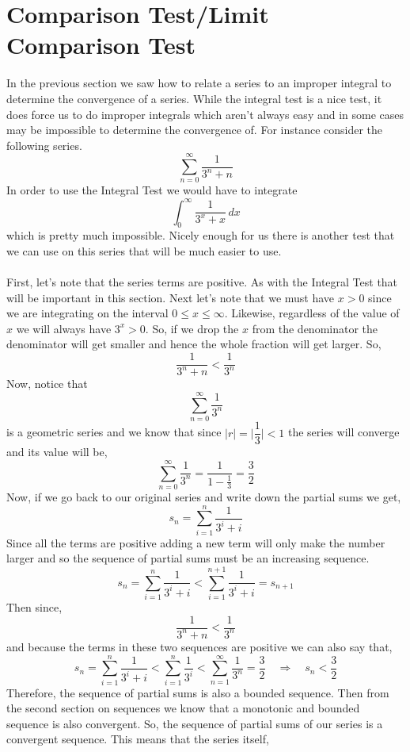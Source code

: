 \documentclass[10pt,reqno]{book}
\theoremstyle{definition}
\begin{document}
	
	\section{Comparison Test/Limit Comparison Test}
	
	In the previous section we saw how to relate a series to an improper integral to determine the convergence of a series. While the integral test is a nice test, it does force us to do improper integrals which aren't always easy and in some cases may be impossible to determine the convergence of. For instance consider the following series.
	\[ \sum\limits_{n=0}^{\infty} \frac{1}{3^n + n} \]
	In order to use the Integral Test we would have to integrate
	\[ \int_{0}^{\infty} \frac{1}{3^x + x}\,dx \]
	which is pretty much impossible. Nicely enough for us there is another test that we can use on this series that will be much easier to use.\\ \\
	First, let's note that the series terms are positive. As with the Integral Test that will be important in this section. Next let's note that we must have $ x > 0 $ since we are integrating on the interval $ 0 \leq x \leq \infty $. Likewise, regardless of the value of $ x $ we will always have $ 3^x > 0 $. So, if we drop the $ x $ from the denominator the denominator will get smaller and hence the whole fraction will get larger. So,
	\[ \frac{1}{3^n + n} < \frac{1}{3^n} \]
	Now, notice that
	\[ \sum\limits_{n=0}^{\infty} \frac{1}{3^n} \]
	is a geometric series and we know that since $ |r| = \bigg|\dfrac{1}{3}\bigg| < 1 $ the series will converge and its value will be,
	\[ \sum\limits_{n=0}^{\infty} \frac{1}{3^n} = \frac{1}{1 - \frac{1}{3}} = \frac{3}{2} \]
	Now, if we go back to our original series and write down the partial sums we get,
	\[ s_n = \sum\limits_{i=1}^{n} \frac{1}{3^i + i} \]
	Since all the terms are positive adding a new term will only make the number larger and so the sequence of partial sums must be an increasing sequence.
	\[ s_n = \sum\limits_{i=1}^{n} \frac{1}{3^i + i} < \sum\limits_{i=1}^{n+1} \frac{1}{3^i + i} = s_{n+1} \]
	Then since,
	\[ \frac{1}{3^n + n} < \frac{1}{3^n} \]
	and because the terms in these two sequences are positive we can also say that,
	\[ s_n = \sum\limits_{i=1}^{n} \frac{1}{3^i + i} < \sum\limits_{i=1}^{n} \frac{1}{3^i} < \sum\limits_{n=1}^{\infty} \frac{1}{3^n} = \frac{3}{2} \quad \Rightarrow \quad s_n < \frac{3}{2} \]
	Therefore, the sequence of partial sums is also a bounded sequence. Then from the second section on sequences we know that a monotonic and bounded sequence is also convergent. So, the sequence of partial sums of our series is a convergent sequence. This means that the series itself,
\end{document}
